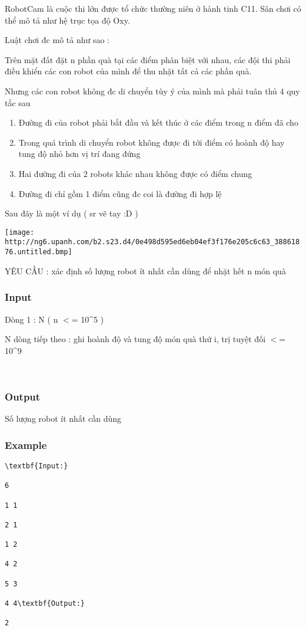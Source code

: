 

RobotCam là cuộc thi lớn được tổ chức thường niên ở hành tinh C11. Sân chơi có thể mô tả như hệ trục tọa độ Oxy.

Luật chơi đc mô tả như sao :

Trên mặt đất đặt n phần quà tại các điểm phân biệt với nhau, các đội thi phải điều khiển các con robot của mình để thu nhặt tất cả các phần quà.

Nhưng các con robot không đc di chuyển tùy ý của mình mà phải tuân thủ 4 quy tắc sau
\begin{enumerate}
	\item Đường đi của robot phải bắt đầu và kết      thúc ở các điểm trong n điểm đã cho
	\item Trong quá trình di chuyển robot không được      đi tới điểm có hoành độ hay tung độ nhỏ hơn vị trí đang đứng
	\item Hai đường đi của 2 robots khác nhau không      được có điểm chung
	\item Đường đi chỉ gồm 1 điểm cũng đc coi là      đường đi hợp lệ
\end{enumerate}

Sau đây là một ví dụ ( sr vẽ tay :D )


\texttt{[image: http://ng6.upanh.com/b2.s23.d4/0e498d595ed6eb04ef3f176e205c6c63\_38861876.untitled.bmp]}

YÊU CẦU : xác định số lượng robot ít nhất cần dùng để nhặt hết n món quà

\subsubsection{Input}

Dòng 1 : N ( n $<$= 10\textasciicircum5 )

N dòng tiếp theo : ghi hoành độ và tung độ món quà thứ i, trị tuyệt đối $<$= 10\textasciicircum9

 

\subsubsection{Output}

Số lượng robot ít nhất cần dùng

\subsubsection{Example}
\begin{verbatim}
\textbf{Input:}

6

1 1

2 1

1 2

4 2

5 3

4 4\textbf{Output:}

2

\end{verbatim}